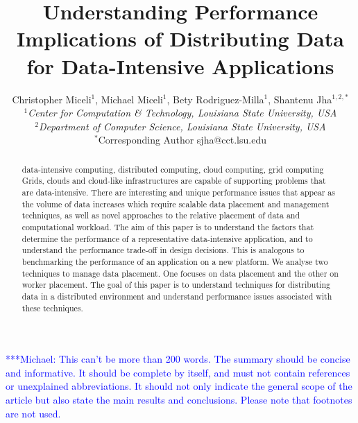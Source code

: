 \documentclass{rspublic}
\title[Understanding Performance Implications of Distributing Data for
Data-Intensive Applications]{Understanding Performance Implications of
Distributing Data for Data-Intensive Applications}
\author[Miceli, Miceli, Rodriguez-Milla, Jha]{ Christopher Miceli$^{1}$,
Michael Miceli$^{1}$, Bety Rodriguez-Milla$^{1}$, Shantenu Jha$^{1,2,*}$ \\
\small{\emph{$^{1}$Center for Computation \& Technology, Louisiana State
University, USA}} \\  \small{\emph{$^{2}$Department of Computer Science,
Louisiana State University, USA}} \\ {\footnotesize {\hspace{0.0 in}
$^*$Corresponding Author sjha@cct.lsu.edu}} }
\newcommand{\micnote}[1]{ {\textcolor{blue} { ***Michael: #1 }}}
\begin{document}
 \maketitle

\micnote{This can't be more than 200 words. The summary should be
concise and informative. It should be complete by itself, and must not
contain references or unexplained abbreviations. It should not only
indicate the general scope of the article but also state the main
results and conclusions. Please note that footnotes are not used.}

\begin{abstract}{data-intensive computing, distributed computing,
    cloud computing, grid computing} 
Grids, clouds and cloud-like infrastructures are capable of supporting
problems that are data-intensive. There are interesting and unique
performance issues that appear as the volume of data increases which
require scalable data placement and management techniques, as well as
novel approaches to the relative placement of data and computational
workload.  The aim of this paper is to understand the factors that
determine the performance of a representative data-intensive
application, and to understand the performance trade-off in design
decisions. This is analogous to benchmarking the performance of an
application on a new platform. We analyse two techniques to manage data
placement. One focuses on data placement and the other on worker
placement. The goal of this paper is to understand techniques for
distributing data in a distributed environment and understand
performance issues associated with these techniques.
\end{abstract}

\end{document}
